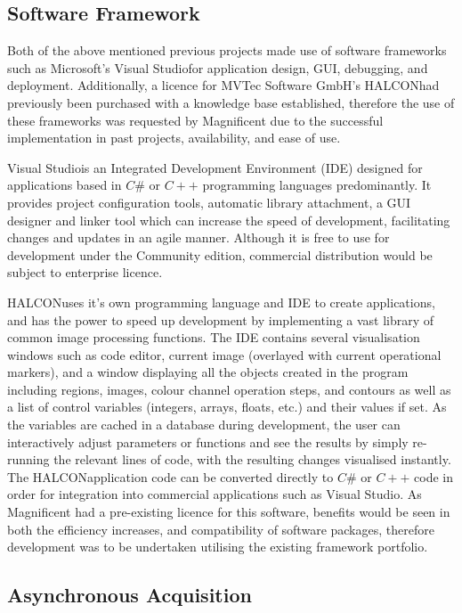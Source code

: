 \documentclass[fleqn,twoside,12pt]{report}
\begin{document}
\subsection{Software Framework}

Both of the above mentioned previous projects made use of software frameworks such as Microsoft's Visual Studio\textregistered for application design, GUI, debugging, and deployment. Additionally, a licence for MVTec Software GmbH's HALCON\texttrademark had previously been purchased with a knowledge base established, therefore the use of these frameworks was requested by Magnificent due to the successful implementation in past projects, availability, and ease of use.

Visual Studio\textregistered is an Integrated Development Environment (IDE) designed for applications based in $C\#$ or $C++$ programming languages predominantly. It provides project configuration tools, automatic library attachment, a GUI designer and linker tool which can increase the speed of development, facilitating changes and updates in an agile manner. Although it is free to use for development under the Community edition, commercial distribution would be subject to enterprise licence. 

HALCON\texttrademark uses it's own programming language and IDE to create applications, and has the power to speed up development by implementing a vast library of common image processing functions. The IDE contains several visualisation windows such as code editor, current image (overlayed with current operational markers), and a window displaying all the objects created in the program including regions, images, colour channel operation steps, and contours as well as a list of control variables (integers, arrays, floats, etc.) and their values if set. As the variables are cached in a database during development, the user can interactively adjust parameters or functions and see the results by simply re-running the relevant lines of code, with the resulting changes visualised instantly. The HALCON\texttrademark application code can be converted directly to $C\#$ or $C++$ code in order for integration into commercial applications such as Visual Studio\textregistered. As Magnificent had a pre-existing licence for this software, benefits would be seen in both the efficiency increases, and compatibility of software packages, therefore development was to be undertaken utilising the existing framework portfolio.


\subsection{Asynchronous Acquisition}
\end{document}
